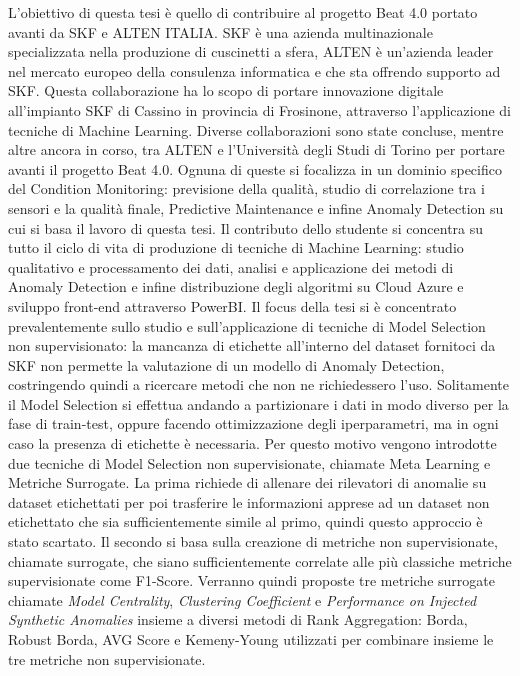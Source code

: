 L’obiettivo di questa tesi è quello di contribuire al progetto Beat 4.0 portato avanti da SKF e ALTEN ITALIA. SKF è una azienda multinazionale specializzata nella produzione di cuscinetti a sfera, ALTEN è un'azienda leader nel mercato europeo della consulenza informatica e che sta offrendo supporto ad SKF. Questa collaborazione ha lo scopo di portare innovazione digitale all'impianto SKF di Cassino in provincia di Frosinone, attraverso l'applicazione di tecniche di Machine Learning.
Diverse collaborazioni sono state concluse\cite{mnardo, jnicolosi}, mentre altre ancora in corso, tra ALTEN e l'Università degli Studi di Torino per portare avanti il progetto Beat 4.0. Ognuna di queste si focalizza in un dominio specifico del Condition Monitoring: previsione della qualità, studio di correlazione tra i sensori e la qualità finale, Predictive Maintenance e infine Anomaly Detection su cui si basa il lavoro di questa tesi.
Il contributo dello studente si concentra su tutto il ciclo di vita di produzione di tecniche di Machine Learning: studio qualitativo e processamento dei dati, analisi e applicazione dei metodi di Anomaly Detection e infine distribuzione degli algoritmi su Cloud Azure e sviluppo front-end attraverso PowerBI.
Il focus della tesi si è concentrato prevalentemente sullo studio e sull'applicazione di tecniche di Model Selection non supervisionato: la mancanza di etichette all'interno del dataset fornitoci da SKF non permette la valutazione di un modello di Anomaly Detection, costringendo quindi a ricercare metodi che non ne richiedessero l'uso. Solitamente il Model Selection si effettua andando a partizionare i dati in modo diverso per la fase di train-test, oppure facendo ottimizzazione degli iperparametri, ma in ogni caso la presenza di etichette è necessaria. Per questo motivo vengono introdotte due tecniche di Model Selection non supervisionate, chiamate Meta Learning\cite{https://doi.org/10.48550/arxiv.2211.01834} e Metriche Surrogate\cite{https://doi.org/10.48550/arxiv.2210.01078}. La prima richiede di allenare dei rilevatori di anomalie su dataset etichettati per poi trasferire le informazioni apprese ad un dataset non etichettato che sia sufficientemente simile al primo, quindi questo approccio è stato scartato. Il secondo si basa sulla creazione di metriche non supervisionate, chiamate surrogate, che siano sufficientemente correlate alle più classiche metriche supervisionate come F1-Score. Verranno quindi proposte tre metriche surrogate chiamate \textit{Model Centrality}, \textit{Clustering Coefficient} e \textit{Performance on Injected Synthetic Anomalies} insieme a diversi metodi di Rank Aggregation: Borda, Robust Borda, AVG Score e Kemeny-Young utilizzati per combinare insieme le tre metriche non supervisionate.

